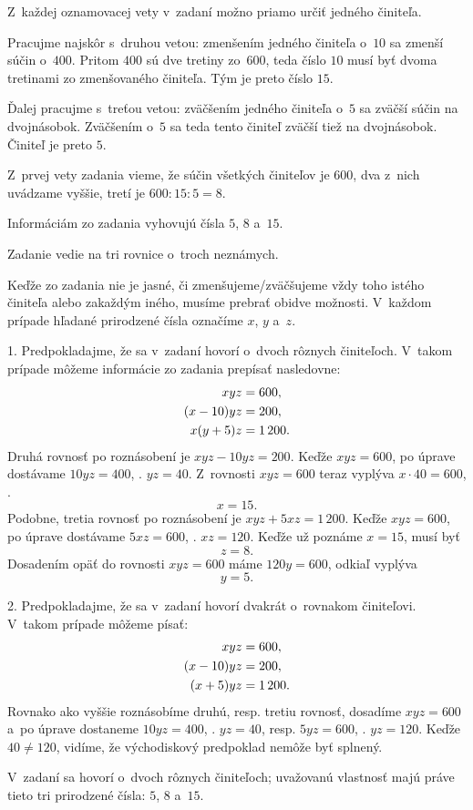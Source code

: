 {%
\napad
Z~každej oznamovacej vety v~zadaní možno priamo určiť jedného činiteľa.

\riesenie
Pracujme najskôr s~druhou vetou:
zmenšením jedného činiteľa o~$10$ sa zmenší súčin o~$400$.
Pritom $400$ sú dve tretiny zo~$600$, teda číslo $10$ musí byť dvoma tretinami zo zmenšovaného činiteľa.
Tým je preto číslo $15$.

Ďalej pracujme s~treťou vetou:
zväčšením jedného činiteľa o~$5$ sa zväčší súčin na dvojnásobok.
Zväčšením o~$5$ sa teda tento činiteľ zväčší tiež na dvojnásobok.
Činiteľ je preto $5$.

Z~prvej vety zadania vieme, že súčin všetkých činiteľov je $600$, dva z~nich uvádzame vyššie, tretí je
$600 : 15 : 5 = 8$.

Informáciám zo zadania vyhovujú čísla $5$, $8$ a~$15$.

\inynapad
Zadanie vedie na tri rovnice o~troch neznámych.

\ineriesenie
Keďže zo zadania nie je jasné, či zmenšujeme/zväčšujeme vždy toho istého
činiteľa alebo zakaždým iného, musíme prebrať obidve možnosti.
V~každom prípade hľadané prirodzené čísla označíme $x$, $y$ a~$z$.

1.
Predpokladajme, že sa v~zadaní hovorí o~dvoch rôznych činiteľoch.
V~takom prípade môžeme informácie zo zadania prepísať nasledovne:
$$
\aligned
xyz&=600,\\
(x-10)yz&=200,\\
x(y+5)z&=1\,200.
\endaligned
$$
Druhá rovnosť po roznásobení je
$xyz-10yz=200$.
Keďže $xyz=600$, po úprave dostávame
$10yz=400$, \tj. $yz=40$.
Z~rovnosti $xyz=600$ teraz vyplýva $x\cdot40=600$, \tj.
$$
x=15.
$$
Podobne, tretia rovnosť po roznásobení je
$xyz+5xz=1\,200$.
Keďže $xyz=600$, po úprave dostávame
$5xz=600$, \tj. $xz=120$.
Keďže už poznáme $x=15$, musí byť
$$
z=8.
$$
Dosadením opäť do rovnosti $xyz=600$ máme $120y=600$, odkiaľ vyplýva
$$
y=5.
$$

2.
Predpokladajme, že sa v~zadaní hovorí dvakrát o~rovnakom činiteľovi.
V~takom prípade môžeme písať:
$$
\aligned
xyz&=600,\\
(x-10)yz&=200,\\
(x+5)yz&=1\,200.
\endaligned
$$
Rovnako ako vyššie roznásobíme druhú, resp. tretiu rovnosť,
dosadíme $xyz=600$ a~po úprave dostaneme
$10yz=400$, \tj. $yz=40$,
resp.
$5yz=600$, \tj. $yz=120$.
Keďže $40\ne120$, vidíme, že východiskový predpoklad nemôže byť splnený.

V~zadaní sa hovorí o~dvoch rôznych činiteľoch;
uvažovanú vlastnosť majú práve tieto tri prirodzené čísla: $5$, $8$ a~$15$.}

